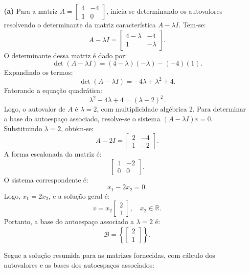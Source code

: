 \begin{resolution}
  {\bf (a)} Para a matriz \( A = \begin{bmatrix} 4 & -4 \\ 1 & 0 \end{bmatrix} \), inicia-se determinando os autovalores resolvendo o determinante da matriz característica \( A - \lambda I \). Tem-se:
  \[
    A - \lambda I = \begin{bmatrix} 4 - \lambda & -4 \\ 1 & -\lambda \end{bmatrix}.
  \]
  O determinante dessa matriz é dado por:
  \[
    \det(A - \lambda I) = (4 - \lambda)(-\lambda) - (-4)(1).
  \]
  Expandindo os termos:
  \[
    \det(A - \lambda I) = -4\lambda + \lambda^2 + 4.
  \]
  Fatorando a equação quadrática:
  \[
    \lambda^2 - 4\lambda + 4 = (\lambda - 2)^2.
  \]
  Logo, o autovalor de \( A \) é \(\lambda = 2\), com multiplicidade algébrica 2. Para determinar a base do autoespaço associado, resolve-se o sistema \( (A - \lambda I)v = 0 \). Substituindo \(\lambda = 2\), obtém-se:
  \[
    A - 2I = \begin{bmatrix} 2 & -4 \\ 1 & -2 \end{bmatrix}.
  \]
  A forma escalonada da matriz é:
  \[
    \begin{bmatrix} 1 & -2 \\ 0 & 0 \end{bmatrix}.
  \]
  O sistema correspondente é:
  \[
    x_1 - 2x_2 = 0.
  \]
  Logo, \( x_1 = 2x_2 \), e a solução geral é:
  \[
    v = x_2 \begin{bmatrix} 2 \\ 1 \end{bmatrix}, \quad x_2 \in \mathbb{R}.
  \]
  Portanto, a base do autoespaço associado a \(\lambda = 2\) é:
  \[
    \mathcal{B} = \left\{ \begin{bmatrix} 2 \\ 1 \end{bmatrix} \right\}.
  \]

  Segue a solução resumida para as matrizes fornecidas, com cálculo dos autovalores e as bases dos autoespaços associados:


\end{resolution}
